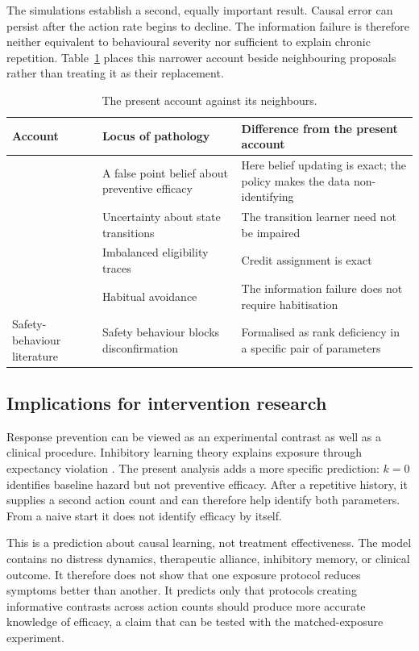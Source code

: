 \documentclass[11pt]{article}
\begin{document}
The simulations establish a second, equally important result. Causal error can
persist after the action rate begins to decline. The information failure is
therefore neither equivalent to behavioural severity nor sufficient to explain
chronic repetition. Table~\ref{tab:accounts} places this narrower account beside
neighbouring proposals rather than treating it as their replacement.

\begin{table}[t]\centering\small
\begin{tabular}{p{3.4cm}p{4.6cm}p{6.2cm}}
\toprule
\textbf{Account} & \textbf{Locus of pathology} & \textbf{Difference from the present account} \\
\midrule
\citet{rigoux2024beliefs} & A false point belief about preventive efficacy &
Here belief updating is exact; the policy makes the data non-identifying \\
\citet{fradkin2020latent} & Uncertainty about state transitions &
The transition learner need not be impaired \\
\citet{sakai2022eligibility} & Imbalanced eligibility traces &
Credit assignment is exact \\
\citet{gillan2014enhanced} & Habitual avoidance &
The information failure does not require habitisation \\
Safety-behaviour literature & Safety behaviour blocks disconfirmation &
Formalised as rank deficiency in a specific pair of parameters \\
\bottomrule
\end{tabular}
\caption{The present account against its neighbours.}
\label{tab:accounts}
\end{table}

\subsection{Implications for intervention research}

Response prevention can be viewed as an experimental contrast as well as a
clinical procedure. Inhibitory learning theory explains exposure through
expectancy violation \citep{craske2014inhibitory}. The present analysis adds a
more specific prediction: $k=0$ identifies baseline hazard but not preventive
efficacy. After a repetitive history, it supplies a second action count and can
therefore help identify both parameters. From a naive start it does not identify
efficacy by itself.

This is a prediction about causal learning, not treatment effectiveness. The
model contains no distress dynamics, therapeutic alliance, inhibitory memory, or
clinical outcome. It therefore does not show that one exposure protocol reduces
symptoms better than another. It predicts only that protocols creating
informative contrasts across action counts should produce more accurate knowledge
of efficacy, a claim that can be tested with the matched-exposure experiment.
\end{document}
